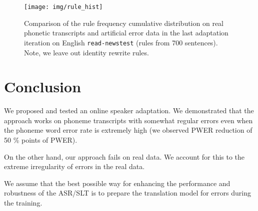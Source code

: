 \begin{figure}[h]
    \texttt{[image: img/rule\_hist]}
    \caption[Comparison of the rule frequency cumulative distribution]{Comparison of the rule frequency cumulative distribution on real phonetic transcripts and artificial error data in the last adaptation iteration on English \texttt{read-newstest} (rules from 700 sentences). Note, we leave out identity rewrite rules.}
    \label{fig:rule_hist} 
\end{figure}

\section{Conclusion}
\label{oeasr:conclusion}
We proposed and tested an online speaker adaptation. We demonstrated that the approach works on phoneme transcripts with somewhat regular errors even when the phoneme word error rate is extremely high (we observed PWER reduction of 50 \% points of PWER). 

On the other hand, our approach fails on real data. We account for this to the extreme irregularity of errors in the real data. 

We assume that the best possible way for enhancing the performance and robustness of the ASR/SLT is to prepare the translation model for errors during the training. 


